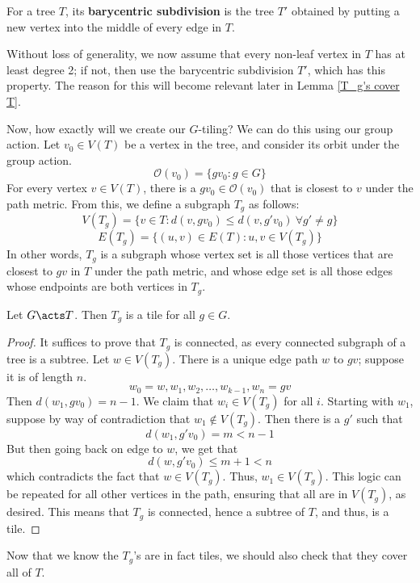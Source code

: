 \begin{defn}
    For a tree $T$, its \textbf{barycentric subdivision} is the tree $T'$ obtained by putting a new vertex into the middle of every edge in $T$. 
\end{defn}

Without loss of generality, we now assume that every non-leaf vertex in $T$ has at least degree 2; if not, then use the barycentric subdivision $T'$, which has this property. The reason for this will become relevant later in Lemma \ref{T_g's cover T}.

Now, how exactly will we create our $G$-tiling? We can do this using our group action. Let $v_0 \in V(T)$ be a vertex in the tree, and consider its orbit under the group action.
\[ \mathcal{O}(v_0) = \{gv_0 : g \in G\} \]
For every vertex $v \in V(T)$, there is a $gv_0 \in \mathcal{O}(v_0)$ that is closest to $v$ under the path metric. From this, we define a subgraph $T_g$ as follows:
\[ V(T_g) = \{v \in T : d(v,gv_0) \leq d(v,g'v_0) \ \forall g' \neq g\} \]
\[ E(T_g) = \{(u,v) \in E(T) : u,v \in V(T_g)\} \]
In other words, $T_g$ is a subgraph whose vertex set is all those vertices that are closest to $gv$ in $T$ under the path metric, and whose edge set is all those edges whose endpoints are both vertices in $T_g$. 

\begin{lemma}\label{Tg is a Tile}
    Let $G \acts T$. Then $T_g$ is a tile for all $g \in G$.
\end{lemma}

\begin{proof}
    It suffices to prove that $T_g$ is connected, as every connected subgraph of a tree is a subtree. Let $w \in V(T_g)$. There is a unique edge path $w$ to $gv$; suppose it is of length $n$.
    \[
    w_0 = w, w_1, w_2, \ldots, w_{k-1}, w_n = gv
    \]
    Then $d(w_1,gv_0) = n-1$. We claim that $w_i \in V(T_g)$ for all $i$. Starting with $w_1$, suppose by way of contradiction that $w_1 \notin V(T_g)$. Then there is a $g'$ such that 
    \[
    d(w_1,g'v_0) = m < n-1
    \]
    But then going back on edge to $w$, we get that 
    \[
    d(w,g'v_0) \leq m+1 < n
    \]
    which contradicts the fact that $w \in V(T_g)$. Thus, $w_1 \in V(T_g)$. This logic can be repeated for all other vertices in the path, ensuring that all are in $V(T_g)$, as desired. This means that $T_g$ is connected, hence a subtree of $T$, and thus, is a tile. 
\end{proof}

Now that we know the $T_g$'s are in fact tiles, we should also check that they cover all of $T$. 

